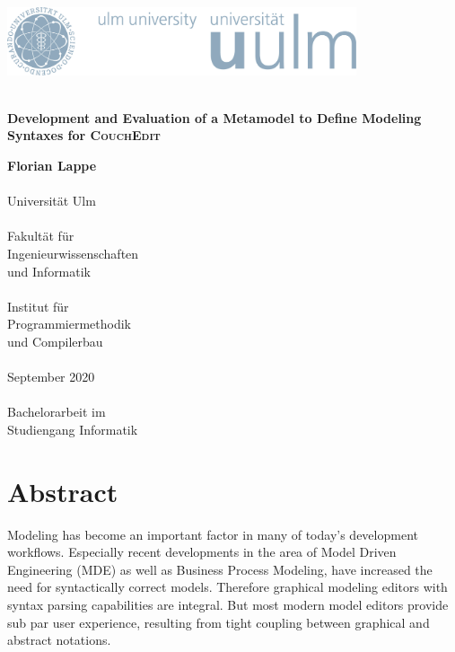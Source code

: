 \documentclass[
a4paper,
numbers=noenddot,      %
bibliography=totoc,              %
BCOR=15mm,               %
leqno					%
]{scrbook}
\newcommand{\fullname}{Florian Lappe}
\newcommand{\titel}{}
\newcommand{\untertitel}{Development and Evaluation of a Metamodel to Define Modeling Syntaxes for \textsc{CouchEdit}}
\newcommand{\abgabedatum}{September 2020}
\newcommand{\abschlussarbeit}{Bachelorarbeit}
\begin{document}
\frontmatter %


\begin{titlepage}
  \selectfont %
  \hfill\includegraphics[height=2.0cm]{images/logo_100_sRGB}\\[3.5cm] %
  \begin{flushright}
    \Huge \textbf{\titel}\\[0.2cm]
    \fontsize{19}{20}\selectfont \textbf{\untertitel}\\
  \end{flushright}

  \vfill\hfill
  \parbox[t]{4.6cm}{
  \singlespacing
  \large
  \textbf{\fullname}\\
  \\
  Universität Ulm\\
  \\
  Fakultät für\\
  Ingenieurwissenschaften\\
  und Informatik\\
  \\
  Institut für\\
  Programmiermethodik\\
  und Compilerbau\\
  \\
  \abgabedatum\\
  \\
  {\abschlussarbeit} im\\
  Studiengang Informatik
  }
\end{titlepage}
\restoregeometry


\clearpage
\thispagestyle{empty}
\chapter*{Abstract}


Modeling has become an important factor in many of today's development workflows. Especially recent developments in the area of Model Driven Engineering (MDE) as well as Business Process Modeling, have increased the need for syntactically correct models. Therefore graphical modeling editors with syntax parsing capabilities are integral. But most modern model editors provide sub par user experience, resulting from tight coupling between graphical and abstract notations. 
\end{document}
